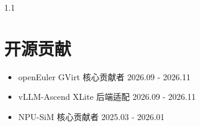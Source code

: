 \documentclass{resume}
\begin{document}
\begin{spacing}{1.1}
		
		\section{开源贡献}
		\begin{itemize}[parsep=0.2ex]
			
			\item openEuler GVirt 核心贡献者 \hfill 2026.09 - 2026.11
			\item vLLM-Ascend XLite 后端适配 \hfill 2026.09 - 2026.11
			\item NPU-SiM 核心贡献者 \hfill 2025.03 - 2026.01
			
		\end{itemize}
		
	\end{spacing}
\end{document}
